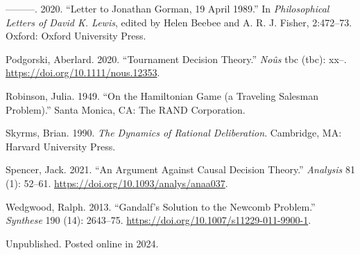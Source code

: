 \documentclass[
  11pt,
  letterpaper,
  DIV=11,
  numbers=noendperiod,
  oneside]{scrartcl}
\newlength{\cslhangindent}
\newenvironment{CSLReferences}[2] %
 {\begin{list}{}{%
  \setlength{\itemindent}{0pt}
  \setlength{\leftmargin}{0pt}
  \setlength{\parsep}{0pt}
  \ifodd #1
   \setlength{\leftmargin}{\cslhangindent}
   \setlength{\itemindent}{-1\cslhangindent}
  \fi
  \setlength{\itemsep}{#2\baselineskip}}}
 {\end{list}}
\begin{document}
\begin{CSLReferences}{1}{0}
---------. 2020. {``Letter to Jonathan Gorman, 19 April 1989.''} In
\emph{Philosophical Letters of David {K}. Lewis}, edited by Helen Beebee
and A. R. J. Fisher, 2:472--73. Oxford: Oxford University Press.

Podgorski, Aberlard. 2020. {``Tournament Decision Theory.''}
\emph{No{û}s} tbc (tbc): xx--. \url{https://doi.org/10.1111/nous.12353}.

Robinson, Julia. 1949. {``On the Hamiltonian Game (a Traveling Salesman
Problem).''} Santa Monica, CA: The RAND Corporation.

Skyrms, Brian. 1990. \emph{The Dynamics of Rational Deliberation}.
Cambridge, MA: Harvard University Press.

Spencer, Jack. 2021. {``An Argument Against Causal Decision Theory.''}
\emph{Analysis} 81 (1): 52--61.
\url{https://doi.org/10.1093/analys/anaa037}.

Wedgwood, Ralph. 2013. {``Gandalf's Solution to the Newcomb Problem.''}
\emph{Synthese} 190 (14): 2643--75.
\url{https://doi.org/10.1007/s11229-011-9900-1}.

\end{CSLReferences}



Unpublished. Posted online in 2024.
\end{document}
